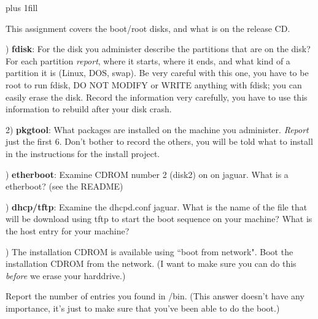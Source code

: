 
\rightskip=0pt plus 1fill

\parindent 0pt

This assignment covers the boot/root disks, and what is on the release CD.

) {\bf fdisk}:
For the disk you administer describe the partitions that are on the disk?
For each partition {\it report}, where it starts, where it ends, and what kind
of a partition it is (Linux, DOS, swap).
Be very careful with this one, you have to be root to run fdisk,
DO NOT MODIFY or WRITE anything with fdisk; 
you can easily erase the disk.
Record the information very carefully, you have to use this information
to rebuild after your disk crash.

2) {\bf pkgtool}:
What packages are installed on the machine you administer.
{\it Report} just the first 6. Don't bother to record the others, you will
be told what to install in the instructions for the install project.

) {\bf etherboot}:
Examine CDROM number 2 (disk2) on on {\ltt{}jaguar}.
What is a {\ltt{}etherboot}? (see the README)

) {\bf dhcp/tftp}:
Examine the {\ltt{}dhcpd.conf} {\ltt{}jaguar}.
What is the name of the file that will be download using tftp to
start the boot sequence on your machine?
What is the host entry for your machine?

) The installation CDROM is available using ``boot from network".
Boot the installation CDROM from the network. (I want to make sure
you can do this {\it before} we erase your harddrive.)

Report the number of entries you found in {\ltt{}/bin}.
(This answer doesn't have any importance, it's just to make sure
that you've been able to do the boot.)

\bye
